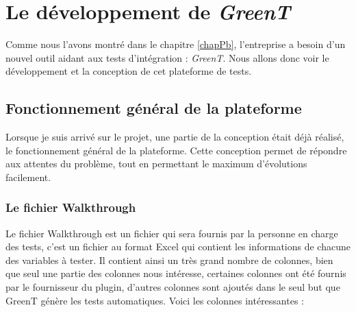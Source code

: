 \chapter{Le développement de \textit{GreenT}}
Comme nous l'avons montré dans le chapitre \ref{chapPb}, l'entreprise a besoin d'un nouvel outil aidant aux tests d'intégration : \textit{GreenT}. Nous allons donc voir le développement et la conception de cet plateforme de tests.
	\section{Fonctionnement général de la plateforme}
	Lorsque je suis arrivé sur le projet, une partie de la conception était déjà réalisé, le fonctionnement général de la plateforme. Cette conception permet de répondre aux attentes du problème, tout en permettant le maximum d'évolutions facilement.
	
	\subsection{Le fichier Walkthrough}\label{wt}
		Le fichier Walkthrough est un fichier qui sera fournis par la personne en charge des tests, c'est un fichier au format Excel qui contient les informations de chacune des variables à tester. Il contient ainsi un très grand nombre de colonnes, bien que seul une partie des colonnes nous intéresse, certaines colonnes ont été fournis par le fournisseur du plugin, d'autres colonnes sont ajoutés dans le seul but que GreenT génère les tests automatiques. Voici les colonnes intéressantes : 

